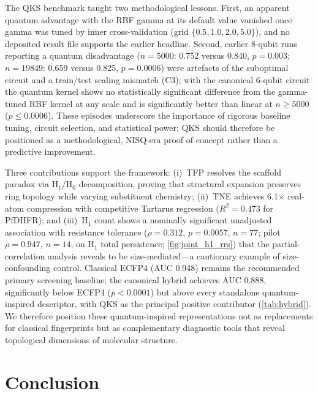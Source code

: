 \documentclass[11pt,a4paper]{article}
\begin{document}
The QKS benchmark taught two methodological lessons. First, an apparent quantum advantage with the RBF gamma at its default value vanished once gamma was tuned by inner cross-validation (grid $\{0.5, 1.0, 2.0, 5.0\}$), and no deposited result file supports the earlier headline. Second, earlier 8-qubit runs reporting a quantum disadvantage ($n = \num{5000}$: \num{0.752} versus \num{0.840}, $p = \num{0.003}$; $n = \num{19849}$: \num{0.659} versus \num{0.825}, $p = \num{0.0006}$) were artefacts of the suboptimal circuit and a train/test scaling mismatch (C3); with the canonical 6-qubit circuit the quantum kernel shows no statistically significant difference from the gamma-tuned RBF kernel at any scale and is significantly better than linear at $n \geq \num{5000}$ ($p \leq \num{0.0006}$). These episodes underscore the importance of rigorous baseline tuning, circuit selection, and statistical power; QKS should therefore be positioned as a methodological, NISQ-era proof of concept rather than a predictive improvement.

Three contributions support the framework: (i)~TFP resolves the scaffold paradox via H$_1$/H$_0$ decomposition, proving that structural expansion preserves ring topology while varying substituent chemistry; (ii)~TNE achieves \num{6.1}$\times$ real-atom compression with competitive Tartarus regression ($R^2 = \num{0.473}$ for PfDHFR); and (iii)~H$_1$ count shows a nominally significant unadjusted association with resistance tolerance ($\rho = \num{0.312}$, $p = \num{0.0057}$, $n = \num{77}$; pilot $\rho = \num{0.947}$, $n = \num{14}$, on H$_1$ total persistence; \cref{fig:joint_h1_rrs}) that the partial-correlation analysis reveals to be size-mediated---a cautionary example of size-confounding control. Classical ECFP4 (AUC \num{0.948}) remains the recommended primary screening baseline; the canonical hybrid achieves AUC \num{0.888}, significantly below ECFP4 ($p < \num{0.0001}$) but above every standalone quantum-inspired descriptor, with QKS as the principal positive contributor (\cref{tab:hybrid}). We therefore position these quantum-inspired representations not as replacements for classical fingerprints but as complementary diagnostic tools that reveal topological dimensions of molecular structure.


\section{Conclusion}
\end{document}
